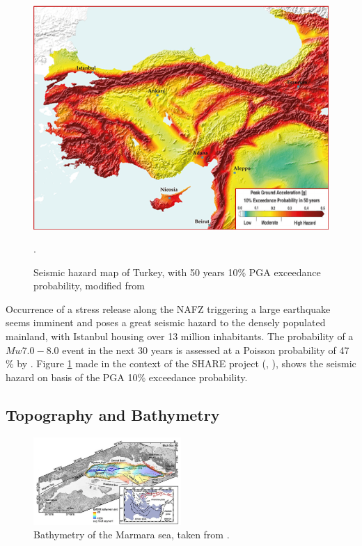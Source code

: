 \documentclass[../Text/00main.tex]{subfiles}
\begin{document}
\begin{figure}
    \centering
    \includegraphics[width=0.5\linewidth]{images_methods/Hazmap_turkey.png}
    \caption{Seismic hazard map of Turkey, with 50 years 10\% PGA exceedance probability, modified from \cite{giardini2018seismic}}.
    \label{fig:hazmap}
\end{figure}
    
Occurrence of a stress release along the NAFZ triggering a large earthquake seems imminent and poses a great seismic hazard to the densely populated mainland, with Istanbul housing over 13 million inhabitants. The probability of a $Mw 7.0 - 8.0$ event in the next 30 years is assessed at a Poisson probability of 47 \% by \cite{murru2016m}. Figure \ref{fig:hazmap} made in the context of the SHARE project (\cite{woessner20152013}, \cite{giardini2018seismic}), shows the seismic hazard on basis of the PGA 10\% exceedance probability.

\subsection{Topography and Bathymetry}

\begin{figure}
    \centering
    \includegraphics[width=0.5\textwidth]{images_methods/Bathy_tect.png}
    \caption{Bathymetry of the Marmara sea, taken from \cite{grall2013slip}.}
    \label{fig:bathymetry}
\end{figure}
\end{document}
